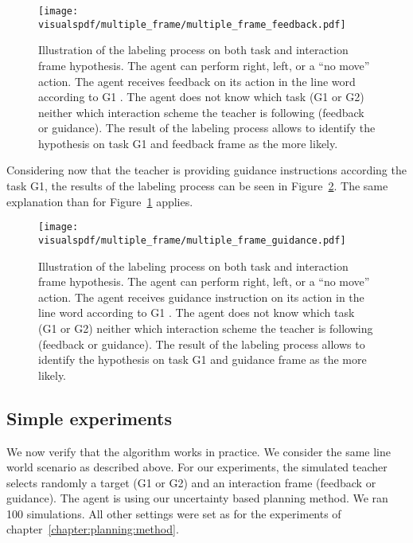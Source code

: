 \begin{figure}[!htbp]
\centering
\texttt{[image: \\visualspdf/multiple\_frame/multiple\_frame\_feedback.pdf]}
\caption{Illustration of the labeling process on both task and interaction frame hypothesis. The agent can perform right, left, or a ``no move'' action. The agent receives feedback on its action in the line word according to G1 . The agent does not know which task (G1 or G2) neither which interaction scheme the teacher is following (feedback or guidance). The result of the labeling process allows to identify the hypothesis on task G1 and feedback frame as the more likely.}
\label{fig:multipleframeexplainedfeedback}
\end{figure} 

\visuopti{\newpage}

Considering now that the teacher is providing guidance instructions according the task G1, the results of the labeling process can be seen in Figure~\ref{fig:multipleframeexplainedguidance}. The same explanation than for Figure~\ref{fig:multipleframeexplainedfeedback} applies. 

\begin{figure}[!htbp]
\centering
\texttt{[image: \\visualspdf/multiple\_frame/multiple\_frame\_guidance.pdf]}
\caption{Illustration of the labeling process on both task and interaction frame hypothesis. The agent can perform right, left, or a ``no move'' action. The agent receives guidance instruction on its action in the line word according to G1 . The agent does not know which task (G1 or G2) neither which interaction scheme the teacher is following (feedback or guidance). The result of the labeling process allows to identify the hypothesis on task G1 and guidance frame as the more likely.}
\label{fig:multipleframeexplainedguidance}
\end{figure} 

\subsection{Simple experiments}

We now verify that the algorithm works in practice. We consider the same line world scenario as described above. For our experiments, the simulated teacher selects randomly a target (G1 or G2) and an interaction frame (feedback or guidance). The agent is using our uncertainty based planning method. We ran 100 simulations. All other settings were set as for the experiments of chapter~\ref{chapter:planning:method}.

